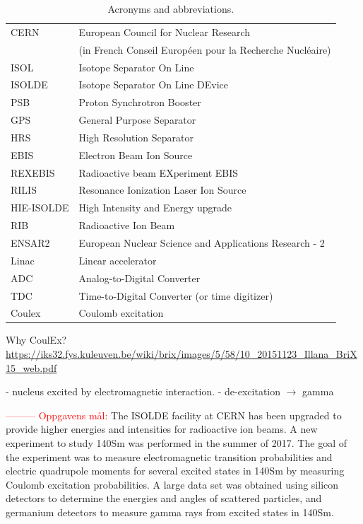 \documentclass[twoside,english]{uiofysmaster/uiofysmaster}
\begin{document}
\begin{table}[H]
  \centering
  \caption{Acronyms and abbreviations.}
    \begin{tabular}{ll}
        \hline
        CERN & European Council for Nuclear Research \\ 
         & (in French Conseil Européen pour la Recherche Nucléaire) \\
        ISOL & Isotope Separator On Line \\
        ISOLDE & Isotope Separator On Line DEvice \\
        PSB & Proton Synchrotron Booster \\
        GPS & General Purpose Separator \\
        HRS & High Resolution Separator \\
        EBIS & Electron Beam Ion Source \\
        REXEBIS & Radioactive beam EXperiment EBIS \\
        RILIS & Resonance Ionization Laser Ion Source \\
        HIE-ISOLDE & High Intensity and Energy upgrade \\
        RIB & Radioactive Ion Beam \\
        ENSAR2 & European Nuclear Science and Applications Research - 2 \\
        Linac & Linear accelerator \\
        ADC & Analog-to-Digital Converter \\
        TDC & Time-to-Digital Converter (or time digitizer) \\
        Coulex & Coulomb excitation \\
        \hline
    \end{tabular}
    \label{tab:acro}
\end{table}


Why CoulEx? \url{https://iks32.fys.kuleuven.be/wiki/brix/images/5/58/10_20151123_Illana_BriX15_web.pdf}

\bigskip

- nucleus excited by electromagnetic interaction. \newline
- de-excitation $\rightarrow$ gamma



\textcolor{red}{---------} \newline
\textcolor{red}{Oppgavens mål:} \newline
The ISOLDE facility at CERN has been upgraded to provide higher energies and intensities for radioactive ion beams. A new experiment to study 140Sm was performed in the summer of 2017. The goal of the experiment was to measure electromagnetic transition probabilities and electric quadrupole moments for several excited states in 140Sm by measuring Coulomb excitation probabilities. A large data set was obtained using silicon detectors to determine the energies and angles of scattered particles, and germanium detectors to measure gamma rays from excited states in 140Sm. \newline
\end{document}
